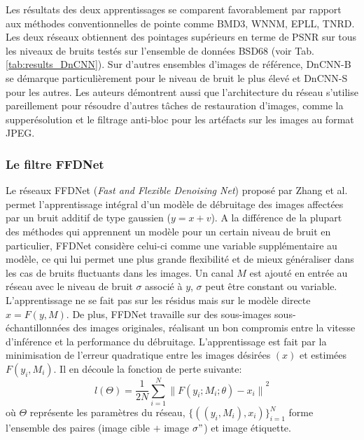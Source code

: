 Les résultats des deux apprentissages se comparent favorablement par rapport aux méthodes conventionnelles de pointe comme BMD3, WNNM, EPLL, TNRD.  Les deux réseaux obtiennent des pointages supérieurs en terme de PSNR sur tous les niveaux de bruits testés sur l'ensemble de données BSD68 (voir Tab. \ref{tab:results_DnCNN}).  Sur d'autres ensembles d'images de référence, DnCNN-B se démarque particulièrement pour le niveau de bruit le plus élevé et DnCNN-S pour les autres.  Les auteurs démontrent aussi que l'architecture du réseau s'utilise pareillement pour résoudre d'autres tâches de restauration d'images, comme la supperésolution et le filtrage anti-bloc pour les artéfacts sur les images au format JPEG.

\subsubsection{Le filtre FFDNet}

Le réseaux FFDNet (\textit{Fast and Flexible Denoising Net}) proposé par Zhang et al. \cite{Zhang2018} permet l'apprentissage intégral d'un modèle de débruitage des images affectées par un bruit additif de type gaussien ($y=x+v$). A la différence de la plupart des méthodes qui apprennent un modèle pour un certain niveau de bruit en particulier, FFDNet considère celui-ci comme une variable supplémentaire au modèle, ce qui lui permet une plus grande flexibilité et de mieux généraliser dans les cas de bruits fluctuants dans les images.  Un canal $M$ est ajouté en entrée au réseau avec le niveau de bruit $\sigma$ associé à $y$, $\sigma$ peut être constant ou variable.  L'apprentissage ne se fait pas sur les résidus mais sur le modèle directe  $x = F(y, M)$. De plus, FFDNet travaille sur des sous-images sous-échantillonnées des images originales, réalisant un bon compromis entre la vitesse d'inférence et la performance du débruitage.  L'apprentissage est fait par la minimisation de l'erreur quadratique entre les images désirées $(x)$ et estimées  $F(y_i, M_i)$.  Il en découle la fonction de perte suivante:
\begin{equation}
    l(\Theta)=\frac{1}{2N}\sum_{i=1}^{N}{\parallel F(y_i; M_i;\theta) - x_i\parallel}^2
\end{equation}
où $\Theta$ représente les paramètres du réseau, $\{((y_i,M_i), x_i)\}_{i=1}^{N}$ forme l'ensemble des paires (image cible $+$ image $\sigma"$) et image étiquette.

